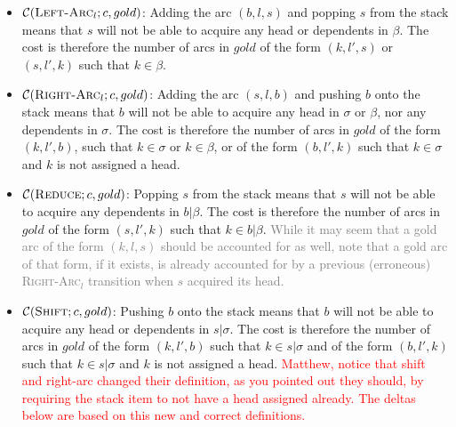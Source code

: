 \documentclass[11pt,letterpaper]{article}
\newcommand{\maybe}[1]{\textcolor{gray}{#1}}
\newcommand{\note}[1]{\textcolor{red}{#1}}
\begin{document}
\begin{itemize}
   \item $\mathcal{C}(\textsc{Left-Arc}_l; c, gold)$: 
Adding the arc $(b, l, s)$ and popping $s$ from the stack means that $s$ will not be able
to acquire any head or dependents in $\beta$. The cost is therefore the number of arcs 
in $gold$ of the form $(k, l', s)$ or $(s, l', k)$ such that $k \in \beta$.

\item $\mathcal{C}(\textsc{Right-Arc}_l; c, gold)$: 
Adding the arc $(s, l, b)$ and pushing $b$ onto the stack means that $b$ will 
not be able to acquire any head in $\sigma$ or $\beta$, nor any dependents in $\sigma$. 
The cost is therefore the number of arcs in $gold$ of the form $(k, l', b)$,
such that $k \in \sigma$ or $k \in \beta$, 
or of the form $(b, l', k)$ such that $k \in \sigma$ 
and $k$ is not assigned a head.

\item $\mathcal{C}(\textsc{Reduce}; c, gold)$: 
Popping $s$ from the stack means that $s$ will not be able to acquire any dependents
in $b|\beta$. The cost is therefore the number of arcs in $gold$ of the form $(s, l', k)$
such that $k \in b|\beta$. \maybe{While it may seem that a gold arc of the form $(k, l, s)$ should be accounted for as well,
note that a gold arc of that form, if it exists, is already accounted for by a previous (erroneous) \textsc{Right-Arc}$_l$ 
transition when $s$ acquired its head.}

\item $\mathcal{C}(\textsc{Shift}; c, gold)$: 
Pushing $b$ onto the stack means that $b$ will not be able to acquire any head
or dependents in $s|\sigma$. The cost is therefore the number of arcs in $gold$ of 
the form $(k, l', b)$ such that $k \in s|\sigma$ and of the form $(b, l', k)$ such that $k \in s|\sigma$
and $k$ is not assigned a head.
\note{Matthew, notice that shift and right-arc changed their definition, as
you pointed out they should, by requiring the stack item to not have a head
assigned already. The deltas below are based on this new and correct
definitions.}
\end{itemize}


\end{document}
